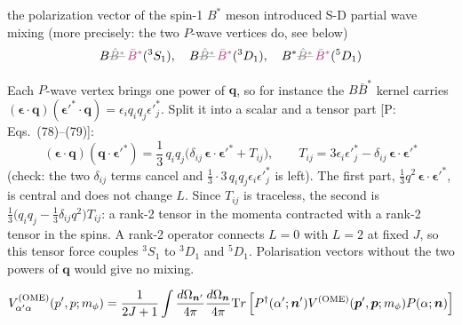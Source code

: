 \documentclass[11pt]{article}
\newcommand{\tagP}[1]{\textcolor{blue!65!black}{\textsf{\small[P:\,#1]}}}
\newcommand{\ai}[1]{\textcolor{aicolor}{#1}}
\newcommand{\aifixm}[2]{\textcolor{gray}{\text{\sout{$#1$}}}\,\textcolor{aicolor}{#2}}
\newcommand{\ai}[1]{#1}
\newcommand{\aifixm}[2]{#2}
\newenvironment{aiadd}{\par}{\par}
\begin{document}
the polarization vector of the spin-1 $B^*$ meson introduced S-D partial wave mixing \ai{(more precisely: the two $P$-wave vertices do, see below)}
\[
	B\aifixm{\hat B^*}{\bar B^*} (^3S_1),\quad B\aifixm{\hat B^*}{\bar B^*}(^3D_1),\quad B^*\aifixm{\hat B^*}{\bar B^*}(^5D_1)
\]
\begin{aiadd}
	Each $P$-wave vertex brings one power of $\bm q$, so for instance the $B\bar B^*$ kernel carries $(\bm\epsilon\cdot\bm q)(\bm\epsilon'^*\cdot\bm q)=\epsilon_iq_iq_j\epsilon'^*_j$. Split it into a scalar and a tensor part \tagP{Eqs.~(78)--(79)}:
	\[
		(\bm\epsilon\cdot\bm q)(\bm q\cdot\bm\epsilon'^*)=\frac13\,q_iq_j\big(\delta_{ij}\,\bm\epsilon\cdot\bm\epsilon'^*+T_{ij}\big),\qquad
		T_{ij}=3\epsilon_i\epsilon'^*_j-\delta_{ij}\,\bm\epsilon\cdot\bm\epsilon'^*
	\]
	(check: the two $\delta_{ij}$ terms cancel and $\frac13\cdot3\,q_iq_j\epsilon_i\epsilon'^*_j$ is left). The first part, $\frac13q^2\,\bm\epsilon\cdot\bm\epsilon'^*$, is central and does not change $L$. Since $T_{ij}$ is traceless, the second is $\frac13\big(q_iq_j-\frac13\delta_{ij}q^2\big)T_{ij}$: a rank-2 tensor in the momenta contracted with a rank-2 tensor in the spins. A rank-2 operator connects $L=0$ with $L=2$ at fixed $J$, so this tensor force couples $^3S_1$ to $^3D_1$ and $^5D_1$. Polarisation vectors without the two powers of $\bm q$ would give no mixing.
\end{aiadd}
\[
	V_{\alpha'\alpha}^{(\rm OME)}(p',p;m_\phi) = \frac{1}{2J+1}\int\frac{d\Omega_{\bm n'}}{4\pi}\frac{d\Omega_{\bm n}}{4\pi}{\mathrm Tr}\left[P^\dagger (\alpha';\bm{n}')V^{(\rm OME)}(\bm{p}',\bm{p};m_\phi)P(\alpha;\bm{n})\right]
\]
\end{document}
